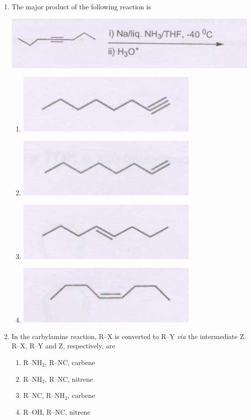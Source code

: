 \documentclass[12pt]{article}
\begin{document}
\begin{enumerate}
\item The major product of the following reaction is

\begin{center}
  \includegraphics[width=0.7\columnwidth]{figs/q10.png} 
\end{center}
\begin{enumerate}
    \item \includegraphics[width=0.3\columnwidth]{figs/q10 a.png}
    \item \includegraphics[width=0.3\columnwidth]{figs/q10 b.png}
    \item \includegraphics[width=0.3\columnwidth]{figs/q10 c.png}
    \item \includegraphics[width=0.3\columnwidth]{figs/q10 d.png}
\end{enumerate}
\hfill{}


 

\item In the carbylamine reaction, R–X is converted to R–Y \textit{via} the intermediate Z.
R–X, R–Y and Z, respectively, are
\begin{enumerate}
    \item R–NH$_2$, R–NC, carbene
    \item R–NH$_2$, R–NC, nitrene
    \item R–NC, R–NH$_2$, carbene
    \item R–OH, R–NC, nitrene     \hfill{}
\end{enumerate}
    


\end{enumerate}
\end{document}
